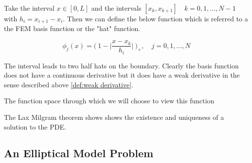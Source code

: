 \documentclass{uonmathreport}
\theoremstyle{definition}
\theoremstyle{problem}
\theoremstyle{theorem}
\begin{document}
Take the interval $x \in [0,L]$ and the intervals $[x_k, x_{k+1}] \quad k=0, 1, ... , N-1$ with $h_i = x_{i+1}-x_i$. Then we can define the below function which is referred to a the FEM basis function or the "hat" function.

\begin{equation}
\phi_j(x) =  \Big(\:1 - \Big|\frac{x-x_k}{h_i}\Big| \: \Big)_+ , \quad j = 0,1,..., N
\end{equation}

The interval leads to two half hats on the boundary. Clearly the basis function does not have a continuous derivative but it does have a weak derivative in the sense described above \ref{def:weak derivative}.

The function space through which we will choose to view this function 

\begin{center}
\end{center}








The Lax Milgram theorem shows shows the existence and uniqueness of a solution to the PDE. 


\clearpage



\subsection{An Elliptical Model Problem} \label{subsec:Weak Formulation1}
\end{document}
